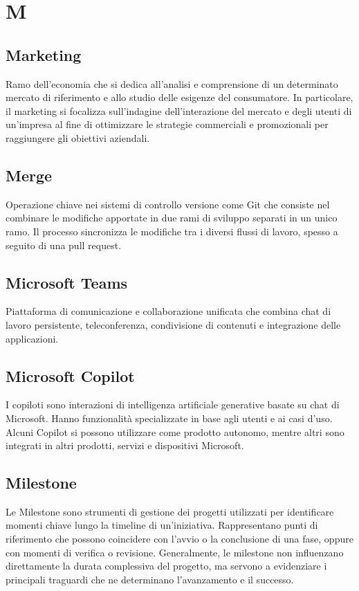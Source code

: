 \documentclass[10pt, letterpaper]{article}
\begin{document}
\section{M}

\subsection*{Marketing}
Ramo dell'economia che si dedica all'analisi e comprensione di un determinato mercato di riferimento e allo studio delle esigenze del consumatore.
In particolare, il marketing si focalizza sull'indagine dell'interazione del mercato e degli utenti di un'impresa al fine di ottimizzare le strategie
commerciali e promozionali per raggiungere gli obiettivi aziendali.

\subsection*{Merge}
Operazione chiave nei sistemi di controllo versione come Git che consiste nel combinare le modifiche apportate in due rami di sviluppo separati in un unico ramo.
Il processo sincronizza le modifiche tra i diversi flussi di lavoro, spesso a seguito di una pull request.

\subsection*{Microsoft Teams}
Piattaforma di comunicazione e collaborazione unificata che combina chat di lavoro persistente, teleconferenza, condivisione di contenuti e integrazione
delle applicazioni.

\subsection*{Microsoft Copilot}
I copiloti sono interazioni di intelligenza artificiale generative basate su chat di Microsoft. Hanno funzionalità specializzate in base agli utenti e ai casi
d'uso. Alcuni Copilot si possono utilizzare come prodotto autonomo, mentre altri sono integrati in altri prodotti, servizi e dispositivi Microsoft.

\subsection*{Milestone}
Le Milestone sono strumenti di gestione dei progetti utilizzati per identificare momenti chiave lungo la timeline di un'iniziativa. Rappresentano punti di
riferimento che possono coincidere con l'avvio o la conclusione di una fase, oppure con momenti di verifica o revisione. Generalmente, le milestone non
influenzano direttamente la durata complessiva del progetto, ma servono a evidenziare i principali traguardi che ne determinano l'avanzamento e il successo.
\end{document}

